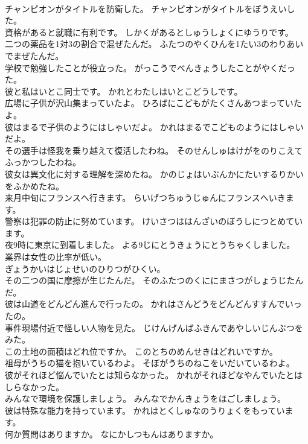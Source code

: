 \documentclass[8pt]{extreport}
\begin{document}
\begin{CJK}{UTF8}{min}
\\	チャンピオンがタイトルを防衛した。	チャンピオンがタイトルをぼうえいした。 
\\	資格があると就職に有利です。	しかくがあるとしゅうしょくにゆうりです。 
\\	二つの薬品を1対3の割合で混ぜたんだ。	ふたつのやくひんを1たい3のわりあいでまぜたんだ。 
\\	学校で勉強したことが役立った。	がっこうでべんきょうしたことがやくだった。 
\\	彼と私はいとこ同士です。	かれとわたしはいとこどうしです。 
\\	広場に子供が沢山集まっていたよ。	ひろばにこどもがたくさんあつまっていたよ。 
\\	彼はまるで子供のようにはしゃいだよ。	かれはまるでこどものようにはしゃいだよ。 
\\	その選手は怪我を乗り越えて復活したわね。	そのせんしゅはけがをのりこえてふっかつしたわね。 
\\	彼女は異文化に対する理解を深めたね。	かのじょはいぶんかにたいするりかいをふかめたね。 
\\	来月中旬にフランスへ行きます。	らいげつちゅうじゅんにフランスへいきます。 
\\	警察は犯罪の防止に努めています。	けいさつははんざいのぼうしにつとめています。 
\\	夜9時に東京に到着しました。	よる9じにとうきょうにとうちゃくしました。 
\\	業界は女性の比率が低い。	
\\	ぎょうかいはじょせいのひりつがひくい。 
\\	その二つの国に摩擦が生じたんだ。	そのふたつのくににまさつがしょうじたんだ。 
\\	彼は山道をどんどん進んで行ったの。	かれはさんどうをどんどんすすんでいったの。 
\\	事件現場付近で怪しい人物を見た。	じけんげんばふきんであやしいじんぶつをみた。 
\\	この土地の面積はどれ位ですか。	このとちのめんせきはどれいですか。 
\\	祖母がうちの猫を抱いているわよ。	そぼがうちのねこをいだいているわよ。 
\\	彼がそれほど悩んでいたとは知らなかった。	かれがそれほどなやんでいたとはしらなかった。 
\\	みんなで環境を保護しましょう。	みんなでかんきょうをほごしましょう。 
\\	彼は特殊な能力を持っています。	かれはとくしゅなのうりょくをもっています。 
\\	何か質問はありますか。	なにかしつもんはありますか。 

\end{CJK}
\end{document}
